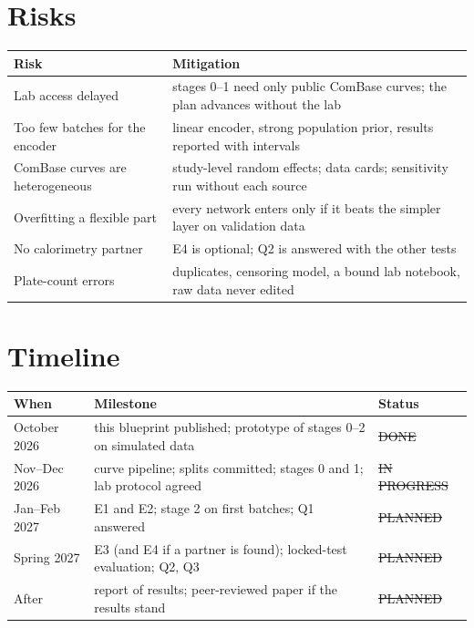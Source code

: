 \section{Risks}
\begin{center}\small\begin{tabular}{@{}p{4.4cm}p{9.3cm}@{}}\toprule\rowcolor{dghead}
Risk & Mitigation\\\midrule
Lab access delayed & stages 0--1 need only public ComBase curves; the plan advances without the lab\\
Too few batches for the encoder & linear encoder, strong population prior, results reported with intervals\\
ComBase curves are heterogeneous & study-level random effects; data cards; sensitivity run without each source\\
Overfitting a flexible part & every network enters only if it beats the simpler layer on validation data\\
No calorimetry partner & E4 is optional; Q2 is answered with the other tests\\
Plate-count errors & duplicates, censoring model, a bound lab notebook, raw data never edited\\
\bottomrule\end{tabular}\end{center}

\section{Timeline}
\begin{center}\small\begin{tabular}{@{}p{3cm}p{8cm}p{2.6cm}@{}}\toprule\rowcolor{dghead}
When & Milestone & Status\\\midrule
October 2026 & this blueprint published; prototype of stages 0--2 on simulated data & \st{DONE}\\
Nov--Dec 2026 & curve pipeline; splits committed; stages 0 and 1; lab protocol agreed & \st{IN PROGRESS}\\
Jan--Feb 2027 & E1 and E2; stage 2 on first batches; Q1 answered & \st{PLANNED}\\
Spring 2027 & E3 (and E4 if a partner is found); locked-test evaluation; Q2, Q3 & \st{PLANNED}\\
After & report of results; peer-reviewed paper if the results stand & \st{PLANNED}\\
\bottomrule\end{tabular}\end{center}

